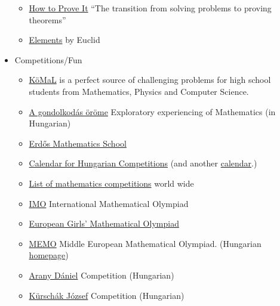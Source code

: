 \documentclass{article}
\begin{document}
\begin{itemize}
\begin{itemize}
        \item \href{https://www.goodreads.com/book/show/739735.How_to_Prove_It}{How to Prove It} ``The transition from solving problems to proving theorems''
    
        \item \href{http://farside.ph.utexas.edu/Books/Euclid/Elements.pdf}{Elements} by Euclid
    \end{itemize}
    
    \item Competitions/Fun
    \begin{itemize}
        \item \href{https://www.komal.hu/home.e.shtml}{KöMaL} is a perfect source of challenging problems for high school students from Mathematics, Physics and Computer Science.
        
        \item \href{https://agondolkodasorome.hu/}{A gondolkodás öröme} Exploratory experiencing of Mathematics (in Hungarian)
        
        \item \href{https://erdosiskola.mik.uni-pannon.hu/}{Erdős Mathematics School}
        
        \item \href{https://agondolkodasorome.hu/versenynaptar/}{Calendar for Hungarian Competitions} (and another \href{http://matek.berzsenyi.hu/versenynaptar}{calendar}.)
        
        \item \href{https://molympiad.wordpress.com/list-of-mathematics-competitions/}{List of mathematics competitions} world wide
        
        \item \href{https://www.imo-official.org/}{IMO} International Mathematical Olympiad
        
        \item \href{https://www.egmo.org/}{European Girls’ Mathematical Olympiad}
        
        \item \href{https://memo-official.org/MEMO/contests/previous/}{MEMO} Middle European Mathematical Olympiad. (Hungarian \href{https://memo.szolda.hu/}{homepage})
        
        \item \href{http://www.bolyai.hu/aranydaniel.htm}{Arany Dániel} Competition (Hungarian)
        
        \item \href{http://www.bolyai.hu/kurschak.htm}{Kürschák József} Competition (Hungarian)
        

\end{itemize}
\end{itemize}
\end{document}
